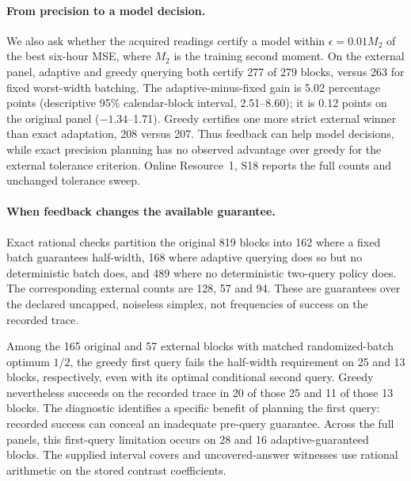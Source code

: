 \documentclass[12pt]{article}
\begin{document}
\paragraph{From precision to a model decision.}
We also ask whether the acquired readings certify a model within
$\epsilon=0.01M_2$ of the best six-hour MSE, where $M_2$ is the training
second moment. On the external panel, adaptive and greedy querying both
certify 277 of 279 blocks, versus 263 for fixed worst-width batching.
The adaptive-minus-fixed gain is 5.02 percentage points (descriptive 95\%
calendar-block interval, 2.51--8.60); it is 0.12 points on the original
panel ($-1.34$--1.71). Greedy certifies one more strict external winner than
exact adaptation, 208 versus 207. Thus feedback can help model decisions,
while exact precision planning has no observed advantage over greedy for
the external tolerance criterion. Online Resource~1, S18 reports the
full counts and unchanged tolerance sweep.
\paragraph{When feedback changes the available guarantee.}
Exact rational checks partition the original 819 blocks into 162 where a fixed batch guarantees half-width, 168 where adaptive querying does so but no deterministic batch does, and 489 where no deterministic two-query policy does. The corresponding external counts are 128, 57 and 94. These are guarantees over the declared uncapped, noiseless simplex, not frequencies of success on the recorded trace.

Among the 165 original and 57 external blocks with matched randomized-batch optimum $1/2$, the greedy first query fails the half-width requirement on 25 and 13 blocks, respectively, even with its optimal conditional second query. Greedy nevertheless succeeds on the recorded trace in 20 of those 25 and 11 of those 13 blocks. The diagnostic identifies a specific benefit of planning the first query: recorded success can conceal an inadequate pre-query guarantee. Across the full panels, this first-query limitation occurs on 28 and 16 adaptive-guaranteed blocks. The supplied interval covers and uncovered-answer witnesses use rational arithmetic on the stored contrast coefficients.
\end{document}
